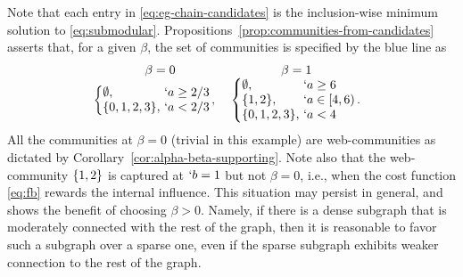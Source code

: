 \begin{example}
	Note that each entry in \eqref{eq:eg-chain-candidates} is the inclusion-wise minimum solution to
	\eqref{eq:submodular}. 
	Propositions~\ref{prop:communities-from-candidates} asserts that, for a given $\beta$, the set of
	communities is specified by the blue line as 
	\begin{align}
		\label{eq:eg-chain}
		\begin{array}{c@{\quad}c}
			 \beta = 0 & \beta = 1 \\%
			\!\!
			\!\!
			\left\{
				\!\!\!
				\begin{array}{l@{\ }l}
					\emptyset, & `a \geq  2/3 
					\\
					\Set{0,1,2,3}, & `a < 2/3
				\end{array}\!\!,
			\right.
			&
			\left\{
				\!\!\!
				\begin{array}{l@{\ }l}
					\emptyset, & `a \geq 6
					\\
					\Set{1,2}, & `a \in  [4, 6)
					\\
					\Set{0,1,2,3}, & `a < 4
				\end{array}\!\!.
			\right.
		\end{array}
	\end{align}
	All the communities at $\beta = 0$ (trivial in this example) are web-communities as
	dictated by Corollary~\ref{cor:alpha-beta-supporting}.
	Note also that
	the web-community $\{1,2\}$ is captured at $`b = 1$ but not $\beta=0$, i.e., when the cost
	function \eqref{eq:fb} rewards the internal influence.%
	This situation may persist in general, and shows the benefit of choosing $\beta > 0$.  Namely, if
	there is a dense subgraph that is moderately connected with the rest of the graph, then it is
	reasonable to favor such a subgraph over a sparse one, even if the sparse subgraph exhibits
	weaker connection to the rest of the graph. 
	

\end{example}
